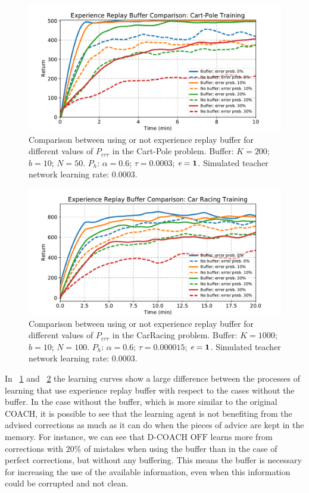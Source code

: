 \begin{figure}[t]
    \centering
    \includegraphics[width=0.8\linewidth]{imagenes/cap3/buffer_cart_pole.pdf}
    \caption{Comparison between using or not experience replay buffer for different values of $P_\mathit{err}$ in the Cart-Pole problem. Buffer: $K = 200$; $b = 10$; $N = 50$. $P_{h}$: $\alpha = 0.6$; $\tau = 0.0003$; $\emph{e}=\textbf{1}$. Simulated teacher network learning rate: $0.0003$.}
    \label{fig:buffer_cart_pole}
\end{figure}

\begin{figure}[t]
    \centering
    \includegraphics[width=0.8\linewidth]{imagenes/cap3/bufferCarRacing.pdf}
    \caption{Comparison between using or not experience replay buffer for different values of $P_\mathit{err}$ in the CarRacing problem. Buffer: $K = 1000$; $b = 10$; $N = 100$. $P_{h}$: $\alpha = 0.6$; $\tau = 0.000015$; $\emph{e}=\textbf{1}$. Simulated teacher network learning rate: $0.0003$.}
    \label{fig:buffer_car_racing}
\end{figure}

In \figurename~{\ref{fig:buffer_cart_pole}} and \figurename~{\ref{fig:buffer_car_racing}} the learning curves show a large difference between the processes of learning that use experience replay buffer with respect to the cases without the buffer. In the case without the buffer, which is more similar to the original COACH, it is possible to see that the learning agent is not benefiting from the advised corrections as much as it can do when the pieces of advice are kept in the memory. For instance, we can see that $\text{D-COACH OFF}$ learns more from corrections with $20 \%$ of mistakes when using the buffer than in the case of perfect corrections, but without any buffering. This means the buffer is necessary for increasing the use of the available information, even when this information could be corrupted and not clean.

